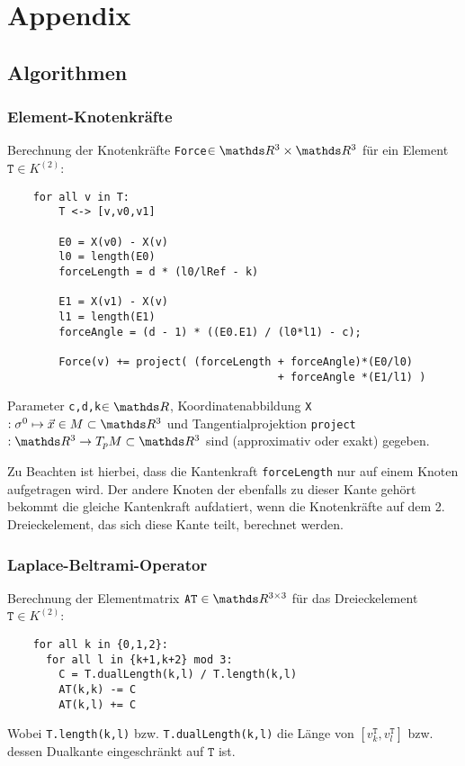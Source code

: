 \newcommand{\trace}{\text{Trace}}


\chapter{Appendix}

\section{Algorithmen}
  
  
  \subsection{Element-Knotenkräfte}
    \label{AlgoForces}
    Berechnung der Knotenkräfte \texttt{Force}\( \in\R^{3}\times\R^{3} \) für ein Element 
    \(\mathtt{T} \in K^{(2)}\):

    \begin{verbatim}
    for all v in T:
        T <-> [v,v0,v1]
        
        E0 = X(v0) - X(v)
        l0 = length(E0)
        forceLength = d * (l0/lRef - k)

        E1 = X(v1) - X(v)
        l1 = length(E1)
        forceAngle = (d - 1) * ((E0.E1) / (l0*l1) - c);

        Force(v) += project( (forceLength + forceAngle)*(E0/l0) 
                                          + forceAngle *(E1/l1) ) 
    \end{verbatim}

    Parameter \texttt{c,d,k}\( \in\R \), 
    Koordinatenabbildung \texttt{X}\(: \sigma^{0} \mapsto \vec{x}\in M \subset \R^{3} \) 
    und Tangentialprojektion \texttt{project}\(: \R^{3} \rightarrow T_{p}M \subset \R^{3} \)
    sind (approximativ oder exakt) gegeben.

    Zu Beachten ist hierbei, dass die Kantenkraft \texttt{forceLength} nur auf einem Knoten aufgetragen wird.
    Der andere Knoten der ebenfalls zu dieser Kante gehört bekommt die gleiche Kantenkraft aufdatiert, wenn die Knotenkräfte auf dem 2. Dreieckelement, das sich diese Kante teilt, berechnet
    werden.

    
  \subsection{Laplace-Beltrami-Operator}
    \label{subsecAlgoLBeltrami}
    Berechnung der Elementmatrix \( \mathtt{AT}\in\R^{3\times 3} \) für das Dreieckelement
    \( \mathtt{T}\in K^{(2)} \):
    \begin{verbatim}
    for all k in {0,1,2}:
      for all l in {k+1,k+2} mod 3:
        C = T.dualLength(k,l) / T.length(k,l)
        AT(k,k) -= C
        AT(k,l) += C
    \end{verbatim}
    Wobei \texttt{T.length(k,l)} bzw. \texttt{T.dualLength(k,l)} die Länge von
    \( \left[ v^{\mathtt{T}}_{k} , v^{\mathtt{T}}_{l} \right] \) bzw. dessen Dualkante eingeschränkt auf \(
   \mathtt{T} \) ist.

